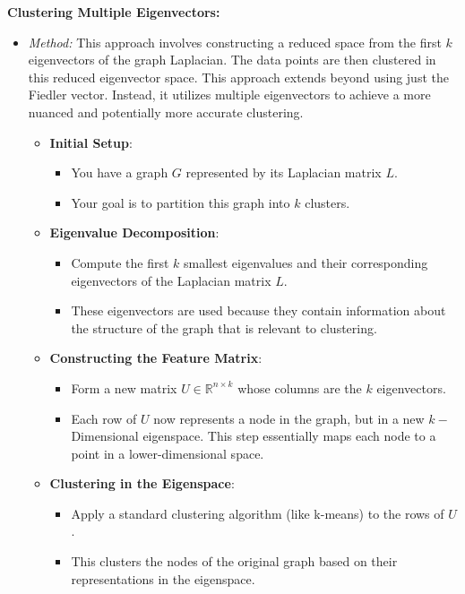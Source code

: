 \documentclass[unicode,11pt,a4paper,oneside,numbers=endperiod,openany]{scrartcl}
\begin{document}
\textbf{Clustering Multiple Eigenvectors:}
\begin{itemize}
    \item \textit{Method:} This approach involves constructing a reduced space from the first \( k \) eigenvectors of the graph Laplacian. The data points are then clustered in this reduced eigenvector space. This approach extends beyond using just the Fiedler vector. Instead, it utilizes multiple eigenvectors to achieve a more nuanced and potentially more accurate clustering.
    \newline
    \begin{itemize}
     \item {\textbf{Initial Setup}:
     \begin{itemize}
      \item You have a graph $G$ represented by its Laplacian matrix $L$.
      \item Your goal is to partition this graph into $k$ clusters.
     \end{itemize}}
     \item{\textbf{Eigenvalue Decomposition}:
     \begin{itemize}
      \item Compute the first $k$ smallest eigenvalues and their corresponding eigenvectors of the Laplacian matrix $L$.
      \item These eigenvectors are used because they contain information about the structure of the graph that is relevant to clustering.
     \end{itemize}}
     \item{\textbf{Constructing the Feature Matrix}:
     \begin{itemize}
      \item Form a new matrix $U\in \mathbb{R}^{n\times k}$ whose columns are the $k$ eigenvectors.
      \item Each row of $U$ now represents a node in the graph, but in a new $k-$Dimensional eigenspace. This step essentially maps each node to a point in a lower-dimensional space.
     \end{itemize}
}
\item{\textbf{Clustering in the Eigenspace}:
\begin{itemize}
 \item Apply a standard clustering algorithm (like k-means) to the rows of $U$.
 \item This clusters the nodes of the original graph based on their representations in the eigenspace.
\end{itemize}
}
\end{itemize}
\end{itemize}
\end{document}
